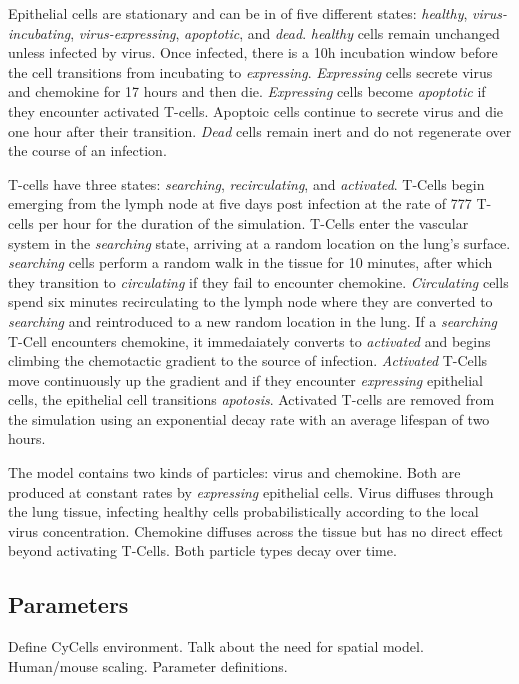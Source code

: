 \documentclass[10pt]{article}
\begin{document}
Epithelial cells are stationary and can be in of five different states: \emph{healthy}, \emph{virus-incubating}, \emph{virus-expressing}, \emph{apoptotic}, and \emph{dead}. \emph{healthy} cells remain unchanged unless infected by virus. Once infected, there is a 10h incubation window before the cell transitions from {incubating} to \emph{expressing}. \emph{Expressing} cells secrete virus and chemokine for 17 hours and then die. \emph{Expressing} cells become \emph{apoptotic} if they encounter activated T-cells. Apoptoic cells continue to secrete virus and die one hour after their transition. \emph{Dead} cells remain inert and do not regenerate over the course of an infection.

T-cells have three states: \emph{searching}, \emph{recirculating}, and \emph{activated}. T-Cells begin emerging from the lymph node at five days post infection at the rate of 777 T-cells per hour for the duration of the simulation. T-Cells enter the vascular system in the \emph{searching} state, arriving at a random location on the lung's surface. \emph{searching} cells perform a random walk in the tissue for 10 minutes, after which they transition to \emph{circulating} if they fail to encounter chemokine. \emph{Circulating} cells spend six minutes recirculating to the lymph node where they are converted to \emph{searching} and reintroduced to a new random location in the lung. If a \emph{searching} T-Cell encounters chemokine, it immedaiately converts to \emph{activated} and begins climbing the chemotactic gradient to the source of infection. \emph{Activated} T-Cells move continuously up the gradient and if they encounter \emph{expressing} epithelial cells, the epithelial cell transitions \emph{apotosis}. Activated T-cells are removed from the simulation using an exponential decay rate with an average lifespan of two hours. 

The model contains two kinds of particles: virus and chemokine. Both are produced at constant rates by \emph{expressing} epithelial cells.  Virus diffuses through the lung tissue, infecting healthy cells probabilistically according to the local virus concentration. Chemokine diffuses across the tissue but has no
direct effect beyond activating T-Cells. Both particle types decay over time.


\subsection*{Parameters}

Define CyCells environment.  Talk about the need for spatial model.  Human/mouse scaling.  Parameter definitions. 
\end{document}

